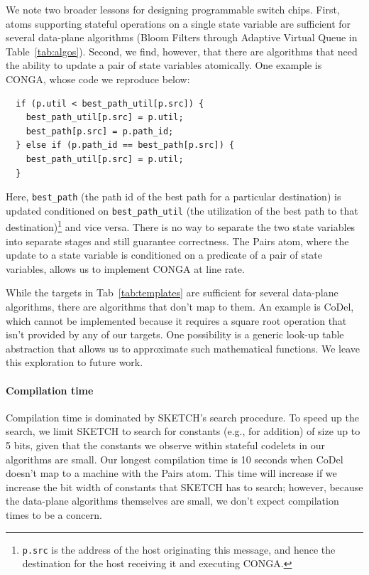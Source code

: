 We note two broader lessons for designing programmable switch chips.  First,
atoms supporting stateful operations on a single state variable are sufficient
for several data-plane algorithms (Bloom Filters through Adaptive Virtual Queue
in Table~\ref{tab:algos}). Second, we find, however, that there are algorithms
that need the ability to update a pair of state variables atomically. One
example is CONGA, whose code we reproduce below:
\begin{verbatim}
  if (p.util < best_path_util[p.src]) {
    best_path_util[p.src] = p.util;
    best_path[p.src] = p.path_id;
  } else if (p.path_id == best_path[p.src]) {
    best_path_util[p.src] = p.util;
  }
\end{verbatim}
Here, \texttt{best\_path} (the path id of the best path for a particular
destination) is updated conditioned on \texttt{best\_path\_util} (the
utilization of the best path to that destination)\footnote{{\tt p.src} is the
  address of the host originating this message, and hence the destination for
the host receiving it and executing CONGA.} and vice versa. There is no way to
separate the two state variables into separate stages and still guarantee
correctness. The Pairs atom, where the update to a state variable is conditioned
on a predicate of a pair of state variables, allows us to implement CONGA at
line rate.

While the targets in Tab~\ref{tab:templates} are sufficient for several
data-plane algorithms, there are algorithms that don't map to them. An example
is CoDel, which cannot be implemented because it requires a square root
operation that isn't provided by any of our targets. One possibility is a
generic look-up table abstraction that allows us to approximate such
mathematical functions. We leave this exploration to future work.
\paragraph{Compilation time}
Compilation time is dominated by SKETCH's search procedure.  To speed up the
search, we limit SKETCH to search for constants (e.g., for addition) of size up
to 5 bits, given that the constants we observe within stateful codelets in our
algorithms are small. Our longest compilation time is 10 seconds when CoDel
doesn't map to a \absmachine machine with the Pairs atom.  This time will
increase if we increase the bit width of constants that SKETCH has to search;
however, because the data-plane algorithms themselves are small, we don't
expect compilation times to be a concern.


